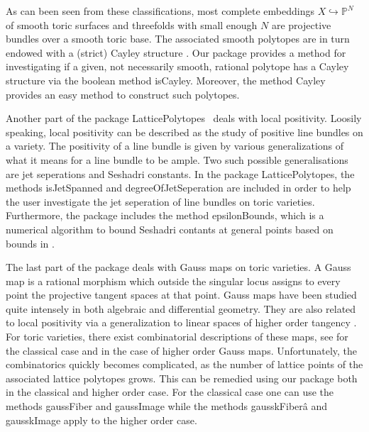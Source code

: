 \documentclass{amsart}
\begin{document}
As can been seen from these classifications, most complete embeddings ${X\hookrightarrow {\mathbb{P}}^N}$ of smooth toric surfaces and threefolds with small enough $N$ are projective bundles over a smooth toric base. The associated smooth polytopes are in turn endowed with a (strict) Cayley structure \cite{SandraLinFib}. 
Our package provides a method for investigating if a given, not necessarily smooth, rational polytope has a Cayley structure via the boolean method \textsf{isCayley}. Moreover, the method \textsf{Cayley} provides an easy method  to construct such polytopes. 

Another part of the package {\textsf{LatticePolytopes}\ } deals with local positivity. Loosily speaking, local positivity can be described as the study of positive line bundles on a variety. The positivity of a line bundle is given by various generalizations of what it means for a line bundle to be ample. 
Two such possible generalisations are jet seperations and Seshadri constants. 
In the package \textsf{LatticePolytopes}, the methods \textsf{isJetSpanned} and \textsf{degreeOfJetSeperation} are included in order to help the user investigate the jet seperation of line bundles on toric varieties. Furthermore, the package includes the method \textsf{epsilonBounds}, which is a numerical algorithm to bound Seshadri contants at general points based on bounds in \cite[Theorem~3.6]{degen}.

The last part of the package deals with Gauss maps on toric varieties. A Gauss map is a rational morphism which outside the singular locus assigns to every point the projective tangent spaces at that point. Gauss maps have been studied quite intensely in both algebraic and differential geometry. They are also related to local positivity via a generalization to linear spaces of higher order tangency \cite{C22, Pohl,GH79}. For toric varieties, there exist combinatorial descriptions of these maps, see \cite{FukukawaIto} for the classical case and \cite{HGM} in the case of higher order Gauss maps. Unfortunately, the combinatorics quickly becomes complicated, as the number of lattice points of the associated lattice polytopes grows. This can be remedied using our package  both in the classical and higher order case. For the classical case one can use the methods \textsf{gaussFiber} and \textsf{gaussImage} while the methods  \textsf{gausskFiber}â  and \textsf{gausskImage} apply to the higher order case.
\end{document}
